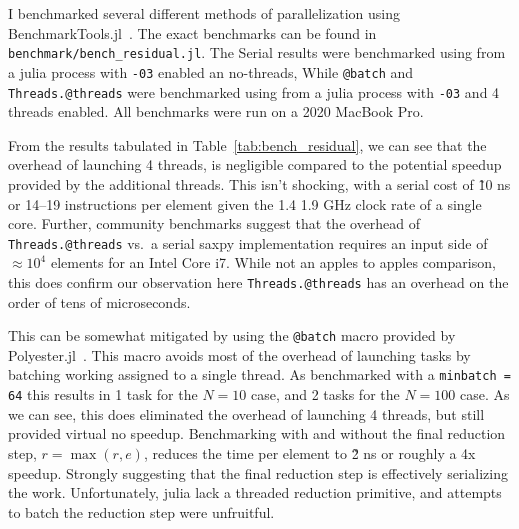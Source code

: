 \documentclass{article}
\begin{document}
I benchmarked several different methods of parallelization using BenchmarkTools.jl~\cite{BenchmarkTools.jl-2016}.
The exact benchmarks can be found in \verb!benchmark/bench_residual.jl!.
The Serial results were benchmarked using from a julia process with \verb!-03! enabled an no-threads, While \verb!@batch! and \verb!Threads.@threads! were benchmarked using from a julia process with \verb!-03! and 4 threads enabled.
All benchmarks were run on a 2020 MacBook Pro.

From the results tabulated in Table~\ref{tab:bench_residual}, we can see that the overhead of launching 4 threads, is negligible compared to the potential speedup provided by the additional threads.
This isn't shocking, with a serial cost of \~10 ns or 14--19 instructions per element given the 1.4 1.9 GHz clock rate of a single core.
Further, community benchmarks suggest that the overhead of \verb!Threads.@threads! vs.\ a serial saxpy implementation requires an input side of \(\approx 10^4\) elements for an Intel Core i7\cite{GccVsThreads2020}.
While not an apples to apples comparison, this does confirm our observation here \verb!Threads.@threads! has an overhead on the order of tens of microseconds.

This can be somewhat mitigated by using the \verb!@batch! macro provided by Polyester.jl~\cite{Polyester2022}.
This macro avoids most of the overhead of launching tasks by batching working assigned to a single thread.
As benchmarked with a \verb!minbatch = 64! this results in 1 task for the \(N = 10\) case, and 2 tasks for the \(N = 100\) case.
As we can see, this does eliminated the overhead of launching 4 threads, but still provided virtual no speedup.
Benchmarking with and without the final reduction step, \( r = \max(r, e) \), reduces the time per element to \~2 ns or roughly a 4x speedup.
Strongly suggesting that the final reduction step is effectively serializing the work.
Unfortunately, julia lack a threaded reduction primitive, and attempts to batch the reduction step were unfruitful.

\section{}

\clearpage
\printbibliography
\end{document}
